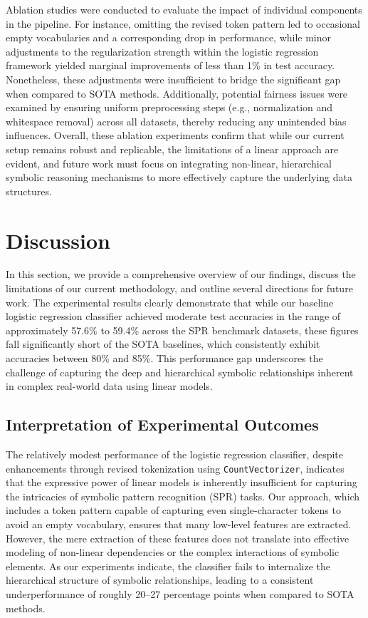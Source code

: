 \documentclass{article}
\begin{document}
Ablation studies were conducted to evaluate the impact of individual components in the pipeline. For instance, omitting the revised token pattern led to occasional empty vocabularies and a corresponding drop in performance, while minor adjustments to the regularization strength within the logistic regression framework yielded marginal improvements of less than 1\% in test accuracy. Nonetheless, these adjustments were insufficient to bridge the significant gap when compared to SOTA methods. Additionally, potential fairness issues were examined by ensuring uniform preprocessing steps (e.g., normalization and whitespace removal) across all datasets, thereby reducing any unintended bias influences. Overall, these ablation experiments confirm that while our current setup remains robust and replicable, the limitations of a linear approach are evident, and future work must focus on integrating non-linear, hierarchical symbolic reasoning mechanisms to more effectively capture the underlying data structures.

\section{Discussion}
In this section, we provide a comprehensive overview of our findings, discuss the limitations of our current methodology, and outline several directions for future work. The experimental results clearly demonstrate that while our baseline logistic regression classifier achieved moderate test accuracies in the range of approximately 57.6\% to 59.4\% across the SPR benchmark datasets, these figures fall significantly short of the SOTA baselines, which consistently exhibit accuracies between 80\% and 85\%. This performance gap underscores the challenge of capturing the deep and hierarchical symbolic relationships inherent in complex real-world data using linear models.

\subsection{Interpretation of Experimental Outcomes}
The relatively modest performance of the logistic regression classifier, despite enhancements through revised tokenization using \texttt{CountVectorizer}, indicates that the expressive power of linear models is inherently insufficient for capturing the intricacies of symbolic pattern recognition (SPR) tasks. Our approach, which includes a token pattern capable of capturing even single-character tokens to avoid an empty vocabulary, ensures that many low-level features are extracted. However, the mere extraction of these features does not translate into effective modeling of non-linear dependencies or the complex interactions of symbolic elements. As our experiments indicate, the classifier fails to internalize the hierarchical structure of symbolic relationships, leading to a consistent underperformance of roughly 20--27 percentage points when compared to SOTA methods.
\end{document}
